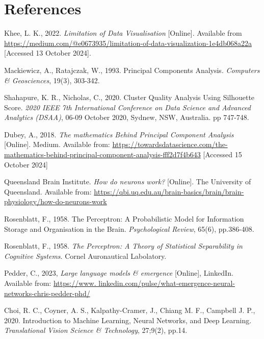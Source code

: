 \documentclass{article}
\begin{document}
\section{References}

Khee, L. K., 2022. \textit{Limitation of Data Visualisation} [Online]. Available from 
\href{https://medium.com/@e0673935/limitation-of-data-visualization-1e4db068a22a}{https://medium.com/@e0673935/\newline limitation-of-data-visualization-1e4db068a22a} [Accessed 13 October 2024]. \newline

\noindent
Mackiewicz, A., Ratajczak, W., 1993. Principal Components Analysis. \textit{Computers \& Geosciences}, 19(3), 303-342. \newline

\noindent
Shahapure, K. R., Nicholas, C., 2020. Cluster Quality Analysis Using Silhouette Score. \textit{2020 IEEE 7th International Conference on Data Science and Advanced Analytics (DSAA)}, 06-09 October 2020, Sydnew, NSW, Australia. pp 747-748.

\noindent
Dubey, A., 2018. \textit{The mathematics Behind Principal Component Analysis} [Online]. Medium. Available from: \href{https://towardsdatascience.com/the-mathematics-behind-principal-component-analysis-fff2d7f4b643}{https://towardsdatascience.com/the-mathematics-behind-principal-component-analysis-fff2d7f4b643} [Accessed 15 October 2024]

\noindent
Queensland Brain Institute. \textit{How do neurons work?} [Online]. The University of Queensland. Available from: \href{https://qbi.uq.edu.au/brain-basics/brain/brain-physiology/how-do-neurons-work}{https://qbi.uq.edu.au/brain-basics/brain/brain-physiology/how-do-neurons-work}

\noindent
Rosenblatt, F., 1958. The Perceptron: A Probabilistic Model for Information Storage and Organisation in the Brain. \textit{Psychological Review}, 65(6), pp.386-408.

\noindent
Rosenblatt, F., 1958. \textit{The Perceptron: A Theory of Statistical Separability in Cognitive Systems}. Cornel Auronautical Labolatory.

\noindent
Pedder, C., 2023, \textit{Large language models \& emergence} [Online], LinkedIn. Available from: \href{https://www.linkedin.com/pulse/what-emergence-neural-networks-chris-pedder-phd/}{https://www.
linkedin.com/pulse/what-emergence-neural-networks-chris-pedder-phd/}

\noindent
Choi, R. C., Coyner, A. S., Kalpathy-Cramer, J., Chiang M. F., Campbell J. P., 2020. Introduction to Machine Learning, Neural Networks, and Deep Learning. \textit{Translational Vision Science \& Technology}, 27;9(2), pp.14.
\end{document}
